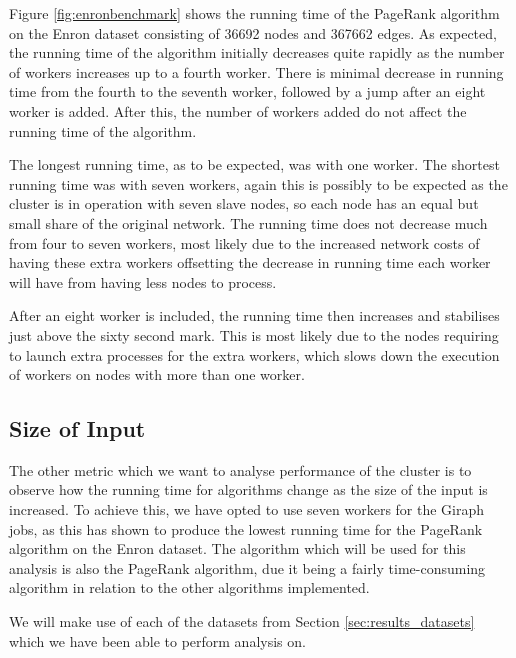 Figure \ref{fig:enronbenchmark} shows the running time of the PageRank algorithm on the Enron dataset consisting of 36692 nodes and 367662 edges. As expected, the running time of the algorithm initially decreases quite rapidly as the number of workers increases up to a fourth worker. There is minimal decrease in running time from the fourth to the seventh worker, followed by a jump after an eight worker is added. After this, the number of workers added do not affect the running time of the algorithm.

The longest running time, as to be expected, was with one worker. The shortest running time was with seven workers, again this is possibly to be expected as the cluster is in operation with seven slave nodes, so each node has an equal but small share of the original network. The running time does not decrease much from four to seven workers, most likely due to the increased network costs of having these extra workers offsetting the decrease in running time each worker will have from having less nodes to process.

After an eight worker is included, the running time then increases and stabilises just above the sixty second mark. This is most likely due to the nodes requiring to launch extra processes for the extra workers, which slows down the execution of workers on nodes with more than one worker.

\subsection{Size of Input}
The other metric which we want to analyse performance of the cluster is to observe how the running time for algorithms change as the size of the input is increased. To achieve this, we have opted to use seven workers for the Giraph jobs, as this has shown to produce the lowest running time for the PageRank algorithm on the Enron dataset. The algorithm which will be used for this analysis is also the PageRank algorithm, due it being a fairly time-consuming algorithm in relation to the other algorithms implemented.

We will make use of each of the datasets from Section \ref{sec:results_datasets} which we have been able to perform analysis on.

